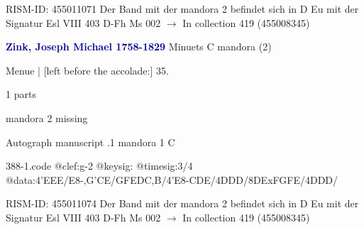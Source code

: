 \documentclass[twocolumn]{book}
\begin{document}
\newline RISM-ID: 455011071
\newline Der Band mit der mandora 2 befindet sich in D Eu mit der Signatur Esl VIII 403
\newline D-Fh  Ms 002
\newline $\rightarrow$ In collection 419 (455008345)

\newline \par \vspace{7pt} \textcolor{darkblue}{\textbf{Zink, Joseph Michael  1758-1829}}
\newline Minuets  C  
\newline mandora (2)
\newline \begin{itshape}[f.20v, at left:] Menue | [left before the accolade:] 35.\end{itshape} 
\newline \textcolor{darkblue}{}  1 parts  
\newline \begin{small} mandora 2 missing\end{small} 
\newline Autograph manuscript
.1  mandora 1  C  
\begin{filecontents*}{388-1.code}
@clef:g-2
@keysig:
@timesig:3/4
@data:4'EEE/E8-,G'CE/GFEDC,B/4'E8-CDE/4DDD/8DExFGFE/4DDD/
\end{filecontents*}
\newline
%

\newline RISM-ID: 455011074
\newline Der Band mit der mandora 2 befindet sich in D Eu mit der Signatur Esl VIII 403
\newline D-Fh  Ms 002
\newline $\rightarrow$ In collection 419 (455008345)
\end{document}
